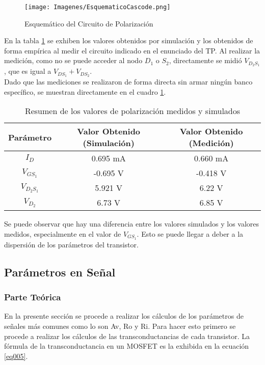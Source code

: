 \documentclass[a4paper,10pt]{article}
\begin{document}
				\begin{figure}[!htb]
					\centering
						\texttt{[image: Imagenes/EsquematicoCascode.png]}
						\caption{Esquemático del Circuito de Polarización} \label{img001}
				\end{figure}

				\indent En la tabla \ref{tab003} se exhiben los valores obtenidos por simulación y los obtenidos de forma empírica al medir el circuito indicado
				en el enunciado del TP. Al realizar la medición, como no se puede acceder al nodo $D_1$ o $S_2$, directamente se midió $V_{D_2S_1}$, que es igual 
				a $V_{DS_1} + V_{DS_2}$. \\
				
				\indent Dado que las mediciones se realizaron de forma directa sin armar ningún banco específico, se muestran directamente en el cuadro  
				\ref{tab003}.  
				 
				\begin{table}[!htb]
					\centering
					\begin{tabular}{|c|c|c|}
						\hline
						Parámetro & Valor Obtenido (Simulación) & Valor Obtenido (Medición)  \\
						\hline
						$I_{D}$ & 0.695 mA & 0.660 mA\\
						\hline
						$V_{GS_1}$ & -0.695 V & -0.418 V \\
						\hline
						$V_{D_2S_1}$ & 5.921 V & 6.22 V\\
						\hline
						$V_{D_2}$ & 6.73 V & 6.85 V\\						
						\hline						
					\end{tabular}
					\caption{Resumen de los valores de polarización medidos y simulados} \label{tab003}
				\end{table}

				Se puede observar que hay una diferencia entre los valores simulados y los valores medidos, especialmente en el valor de $V_{GS_1}$. Esto se puede 
				llegar a deber a la dispersión de los parámetros del transistor. %
				 

		\subsection{Parámetros en Señal}
			\subsubsection{Parte Teórica}
				En la presente sección se procede a realizar los cálculos de los parámetros de señales más comunes como lo son Av, Ro y Ri. Para hacer esto primero 
				se procede a realizar los cálculos de las transconductancias de cada transistor. La fórmula de la transconductancia en un MOSFET es la exhibida en
				la ecuación \ref{eq005}. 
\end{document}
